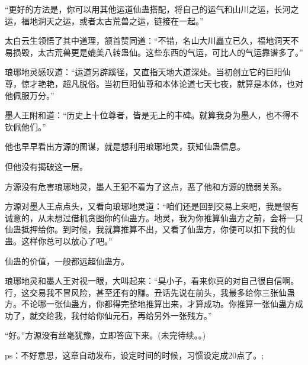 \begin{this_body}
“更好的方法是，你可以用其他运道仙蛊搭配，将自己的运气和山川之运，长河之运，福地洞天之运，或者太古荒兽之运，链接在一起。”

太白云生领悟了其中道理，颔首赞同道：“不错，名山大川矗立已久，福地洞天不易损毁，太古荒兽更是媲美八转蛊仙。这些东西的气运，可比人的气运靠谱多了。”

琅琊地灵感叹道：“运道另辟蹊径，又直指天地大道深处。当初创立它的巨阳仙尊，惊才艳艳，超凡脱俗。当初巨阳仙尊和本体论道七天七夜，就算是本体，也对他佩服万分。”

墨人王附和道：“历史上十位尊者，皆是无上的丰碑。就算我身为墨人，也不得不钦佩他们。”

他也早早看出方源的图谋，就是想利用琅琊地灵，获知仙蛊信息。

但他没有揭破这一层。

方源没有危害琅琊地灵，墨人王犯不着为了这点，恶了他和方源的脆弱关系。

方源对墨人王点点头，又看向琅琊地灵道：“咱们还是回到交易上来吧，我是很有诚意的，从未想过借机贪图你的仙蛊方。地灵，我为你推算仙蛊方之前，会将一只仙蛊抵押给你。到时候，我就算推算不出，又看了仙蛊方，你便可以扣下我的仙蛊。这样你总可以放心了吧。”

仙蛊的价值，一般都远超仙蛊方。

琅琊地灵和墨人王对视一眼，大叫起来：“臭小子，看来你真的对自己很自信啊。行，这交易我不冒风险，甚至还有的赚。丑话先说在前头，我最多给你三张仙蛊方。不论哪一张仙蛊方，你都得完整地推算出来，才算成功。你推算一张仙蛊方成功了，就交给我，我付给你仙元石，再给另外一张残方。”

“好。”方源没有丝毫犹豫，立即答应下来。(未完待续。。)

ps：不好意思，这章自动发布，设定时间的时候，习惯设定成20点了。;

\end{this_body}

